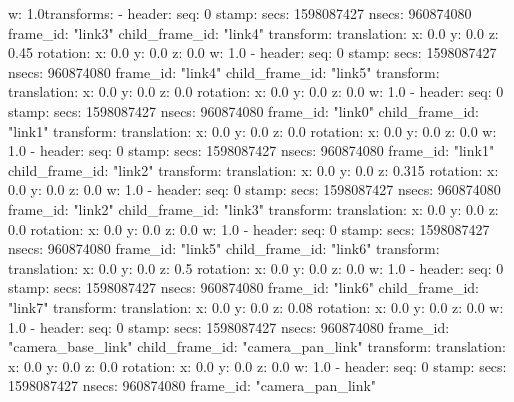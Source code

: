         w: 1.0transforms: 
  - 
    header: 
      seq: 0
      stamp: 
        secs: 1598087427
        nsecs: 960874080
      frame_id: "link3"
    child_frame_id: "link4"
    transform: 
      translation: 
        x: 0.0
        y: 0.0
        z: 0.45
      rotation: 
        x: 0.0
        y: 0.0
        z: 0.0
        w: 1.0
  - 
    header: 
      seq: 0
      stamp: 
        secs: 1598087427
        nsecs: 960874080
      frame_id: "link4"
    child_frame_id: "link5"
    transform: 
      translation: 
        x: 0.0
        y: 0.0
        z: 0.0
      rotation: 
        x: 0.0
        y: 0.0
        z: 0.0
        w: 1.0
  - 
    header: 
      seq: 0
      stamp: 
        secs: 1598087427
        nsecs: 960874080
      frame_id: "link0"
    child_frame_id: "link1"
    transform: 
      translation: 
        x: 0.0
        y: 0.0
        z: 0.0
      rotation: 
        x: 0.0
        y: 0.0
        z: 0.0
        w: 1.0
  - 
    header: 
      seq: 0
      stamp: 
        secs: 1598087427
        nsecs: 960874080
      frame_id: "link1"
    child_frame_id: "link2"
    transform: 
      translation: 
        x: 0.0
        y: 0.0
        z: 0.315
      rotation: 
        x: 0.0
        y: 0.0
        z: 0.0
        w: 1.0
  - 
    header: 
      seq: 0
      stamp: 
        secs: 1598087427
        nsecs: 960874080
      frame_id: "link2"
    child_frame_id: "link3"
    transform: 
      translation: 
        x: 0.0
        y: 0.0
        z: 0.0
      rotation: 
        x: 0.0
        y: 0.0
        z: 0.0
        w: 1.0
  - 
    header: 
      seq: 0
      stamp: 
        secs: 1598087427
        nsecs: 960874080
      frame_id: "link5"
    child_frame_id: "link6"
    transform: 
      translation: 
        x: 0.0
        y: 0.0
        z: 0.5
      rotation: 
        x: 0.0
        y: 0.0
        z: 0.0
        w: 1.0
  - 
    header: 
      seq: 0
      stamp: 
        secs: 1598087427
        nsecs: 960874080
      frame_id: "link6"
    child_frame_id: "link7"
    transform: 
      translation: 
        x: 0.0
        y: 0.0
        z: 0.08
      rotation: 
        x: 0.0
        y: 0.0
        z: 0.0
        w: 1.0
  - 
    header: 
      seq: 0
      stamp: 
        secs: 1598087427
        nsecs: 960874080
      frame_id: "camera_base_link"
    child_frame_id: "camera_pan_link"
    transform: 
      translation: 
        x: 0.0
        y: 0.0
        z: 0.0
      rotation: 
        x: 0.0
        y: 0.0
        z: 0.0
        w: 1.0
  - 
    header: 
      seq: 0
      stamp: 
        secs: 1598087427
        nsecs: 960874080
      frame_id: "camera_pan_link"
